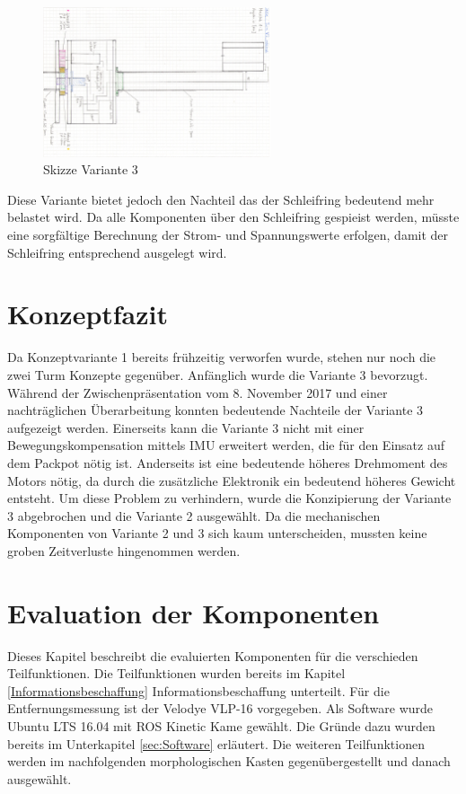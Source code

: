 \begin{figure}[H]
	\centering
	\includegraphics[angle=90,width=0.6\textwidth]{resources/skizze_rotierend.PNG}
	\caption[Skizze Varainte 3]{Skizze Variante 3 }
	\label{fig:skizze_rotierend}
\end{figure} 

Diese Variante bietet jedoch den Nachteil das der Schleifring bedeutend mehr belastet wird. Da alle Komponenten über den Schleifring gespieist werden, müsste eine sorgfältige Berechnung der Strom- und Spannungswerte erfolgen, damit der Schleifring entsprechend ausgelegt wird.

 \section {Konzeptfazit}
 \label{sec:Konzeptfazit}
 
 Da Konzeptvariante 1 bereits frühzeitig verworfen wurde, stehen nur noch die zwei Turm Konzepte gegenüber. Anfänglich wurde die Variante 3 bevorzugt. Während der Zwischenpräsentation vom 8. November 2017 und einer nachträglichen Überarbeitung konnten bedeutende Nachteile der Variante 3 aufgezeigt werden. Einerseits kann die Variante 3 nicht mit einer Bewegungskompensation mittels \ac{IMU} erweitert werden, die für den Einsatz auf dem Packpot nötig ist. Anderseits ist eine bedeutende höheres Drehmoment des Motors nötig, da durch die zusätzliche Elektronik ein bedeutend höheres Gewicht entsteht. Um diese Problem zu verhindern, wurde die Konzipierung der Variante 3 abgebrochen und die Variante 2 ausgewählt. Da die mechanischen Komponenten von Variante 2 und 3 sich kaum unterscheiden, mussten keine groben Zeitverluste hingenommen werden.
 
\section {Evaluation der Komponenten}
\label{sec:ausgewählteKomponenten}
Dieses Kapitel beschreibt die evaluierten Komponenten für die verschieden Teilfunktionen. Die Teilfunktionen wurden bereits im  Kapitel \ref{Informationsbeschaffung} Informationsbeschaffung unterteilt. Für die Entfernungsmessung ist der Velodye VLP-16 vorgegeben. Als Software wurde Ubuntu LTS 16.04 mit ROS Kinetic Kame gewählt. Die Gründe dazu wurden bereits im Unterkapitel \ref{sec:Software} erläutert. Die weiteren Teilfunktionen werden im nachfolgenden morphologischen Kasten gegenübergestellt und danach ausgewählt.

